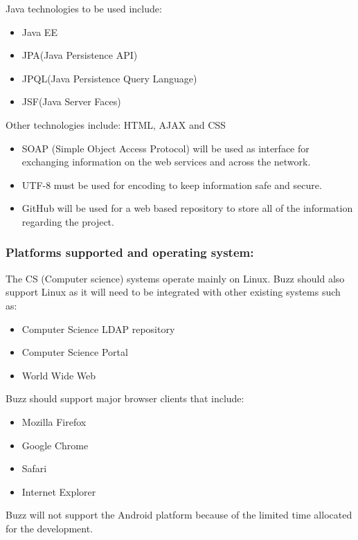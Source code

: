 \documentclass[11pt]{article}
\begin{document}
		
	
			\textbf{}Java technologies to be used include:
   	\begin{itemize}		
			\item Java EE
			\item JPA(Java Persistence API)
			\item JPQL(Java  Persistence Query Language)
	 		\item JSF(Java Server Faces)
	\end{itemize}
		\textbf{} Other technologies include: HTML, AJAX and CSS
			\begin{itemize}		
			
		\item 	SOAP (Simple Object Access Protocol) will be used as interface for exchanging information on the web services and across the network.
		\item 	UTF-8 must be used for encoding to keep information safe and secure.
		
		\item 	GitHub will be used for a web based repository to store all of the information regarding the project.
			\end{itemize}
			\subsubsection{Platforms supported and operating system:}
		
			
			\textbf{}The CS (Computer science) systems operate mainly on Linux. Buzz should also support Linux as it will need to be integrated with other existing systems such as:
			\begin{itemize}		
				\item	Computer Science LDAP repository
				\item 	Computer Science Portal
				\item 	World Wide Web
			\end{itemize}
			\textbf{}Buzz should support major browser clients that include:
			\begin{itemize}		
					\item		Mozilla Firefox
					\item		Google Chrome
					\item		Safari
					\item		Internet Explorer
				
			\end{itemize}
			\textbf{}Buzz will not support the Android platform because of the limited time allocated for the development.
\end{document}
